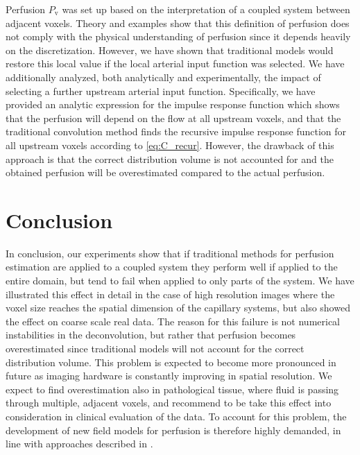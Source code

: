 \documentclass[journal,twocolumn]{IEEEtran}
\newcommand{\Perfv}{P_{\mathrm{v}}}
\begin{document}
	Perfusion $\Perfv$ was set up based on the interpretation of a coupled system between adjacent voxels. 
	Theory and examples show that this definition of perfusion does not comply with the physical understanding of perfusion since it depends heavily on the discretization.
	However, we have shown that traditional models would restore this local value if the local arterial input function was selected.
	We have additionally analyzed, both analytically and experimentally, the impact of selecting a further upstream arterial input function.
	Specifically, we have provided an analytic expression for the impulse response function which shows that the 
	perfusion will depend on the flow at all upstream voxels, and that the traditional convolution method finds the recursive impulse response function for all upstream voxels according to \eqref{eq:C_recur}. However, the drawback of this approach is that the correct distribution volume is not accounted for and the obtained perfusion will be overestimated compared to the actual perfusion.
	
	\section{Conclusion}
	In conclusion, our experiments show that if traditional methods for perfusion estimation are applied to a coupled system they perform well if applied to the entire domain, but tend to fail when applied to only parts of the system. 
	We have illustrated this effect in detail in the case of high resolution images where the voxel size reaches the spatial dimension of the capillary systems, but also showed the effect on coarse scale real data.
		The reason for this failure is not numerical instabilities in the deconvolution, but rather that perfusion becomes overestimated since traditional models will not account for the correct distribution volume.
  	This problem is expected to become more pronounced in future as imaging hardware is constantly improving in spatial resolution.
	We expect to find overestimation also in pathological tissue, where fluid is passing through multiple, adjacent voxels, and recommend to be take this effect into consideration in clinical evaluation of the data. To account for this problem, the development of new field models for perfusion is therefore highly demanded, in line with approaches described in \cite{sourbron14,Michler2013}. 	
	

	
		
	
	
\end{document}
